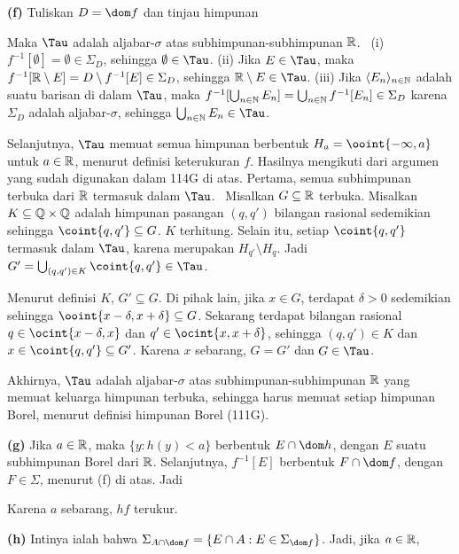 {\medskip

{\bf (f)} Tuliskan $D=\dom f$ dan tinjau himpunan


\noindent Maka $\Tau$ adalah aljabar-$\sigma$ atas
subhimpunan-subhimpunan $\Bbb R$.
\Prf\ {(i)} $f^{-1}[\emptyset]=\emptyset\in\Sigma_D$, sehingga
$\emptyset\in\Tau$. {(ii)} Jika $E\in\Tau$, maka
$f^{-1}[\Bbb R\setminus E]=D\setminus f^{-1}[E]\in\Sigma_D$,
sehingga $\Bbb R\setminus E\in\Tau$.
{(iii)} Jika $\langle E_n\rangle_{n\in\Bbb N}$ adalah suatu barisan
di dalam $\Tau$, maka
$f^{-1}[\bigcup_{n\in\Bbb N}E_n]
=\bigcup_{n\in\Bbb N}f^{-1}[E_n]\in\Sigma_D$ karena $\Sigma_D$
adalah aljabar-$\sigma$, sehingga $\bigcup_{n\in\Bbb N}E_n\in\Tau$.\ \Qed

Selanjutnya, $\Tau$ memuat semua himpunan berbentuk
$H_a=\ooint{-\infty,a}$ untuk $a\in\Bbb R$, menurut definisi
keterukuran $f$. Hasilnya mengikuti dari argumen yang sudah digunakan
dalam 114G di atas. Pertama, semua subhimpunan terbuka dari $\Bbb R$
termasuk dalam $\Tau$. \Prf\ Misalkan $G\subseteq\Bbb R$ terbuka.
Misalkan $K\subseteq\Bbb Q\times\Bbb Q$ adalah himpunan pasangan
$(q,q')$ bilangan rasional sedemikian sehingga
$\coint{q,q'}\subseteq G$. $K$ terhitung. Selain itu, setiap
$\coint{q,q'}$ termasuk dalam $\Tau$, karena merupakan
$H_{q'}\setminus H_q$. Jadi
$G'=\bigcup_{(q,q')\in K}\coint{q,q'}\in\Tau$.

Menurut definisi $K$, $G'\subseteq G$. Di pihak lain, jika $x\in G$,
terdapat $\delta>0$ sedemikian sehingga
$\ooint{x-\delta,x+\delta}\subseteq G$. Sekarang terdapat bilangan
rasional $q\in\ocint{x-\delta,x}$ dan
$q'\in\ocint{x,x+\delta}$, sehingga $(q,q')\in K$ dan
$x\in\coint{q,q'}\subseteq G'$. Karena $x$ sebarang, $G=G'$ dan
$G\in\Tau$.\ \Qed

Akhirnya, $\Tau$ adalah aljabar-$\sigma$ atas subhimpunan-subhimpunan
$\Bbb R$ yang memuat keluarga himpunan terbuka, sehingga harus memuat
setiap himpunan Borel, menurut definisi himpunan Borel (111G).

\medskip

{\bf (g)} Jika $a\in\Bbb R$, maka $\{y:h(y)<a\}$ berbentuk
$E\cap\dom h$, dengan $E$ suatu subhimpunan Borel dari $\Bbb R$.
Selanjutnya, $f^{-1}[E]$ berbentuk $F\cap\dom f$, dengan $F\in\Sigma$,
menurut (f) di atas. Jadi


\noindent Karena $a$ sebarang, $hf$ terukur.

\medskip

{\bf (h)} Intinya ialah bahwa
$\Sigma_{A\cap\dom f}=\{E\cap A:E\in\Sigma_{\dom f}\}$. Jadi, jika
$a\in\Bbb R$,

}%

